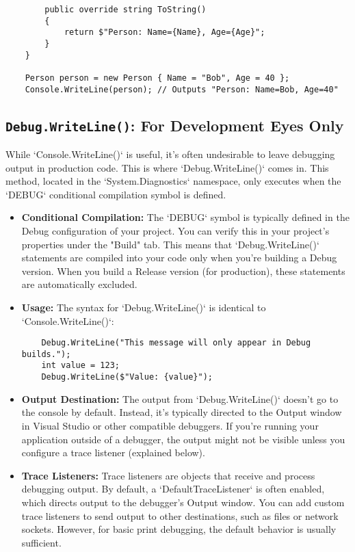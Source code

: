\documentclass{article}
\begin{document}
{{{{\begin{itemize}
\begin{verbatim}
        public override string ToString()
        {
            return $"Person: Name={Name}, Age={Age}";
        }
    }

    Person person = new Person { Name = "Bob", Age = 40 };
    Console.WriteLine(person); // Outputs "Person: Name=Bob, Age=40"
    \end{verbatim}
\end{itemize}

\subsection*{\texttt{Debug.WriteLine()}: For Development Eyes Only}

While `Console.WriteLine()` is useful, it's often undesirable to leave debugging output in production code. This is where `Debug.WriteLine()` comes in. This method, located in the `System.Diagnostics` namespace, only executes when the `DEBUG` conditional compilation symbol is defined.

\begin{itemize}
    \item \textbf{Conditional Compilation:} The `DEBUG` symbol is typically defined in the Debug configuration of your project. You can verify this in your project's properties under the "Build" tab. This means that `Debug.WriteLine()` statements are compiled into your code only when you're building a Debug version. When you build a Release version (for production), these statements are automatically excluded.

    \item \textbf{Usage:} The syntax for `Debug.WriteLine()` is identical to `Console.WriteLine()`:

    \begin{verbatim}
    Debug.WriteLine("This message will only appear in Debug builds.");
    int value = 123;
    Debug.WriteLine($"Value: {value}");
    \end{verbatim}

    \item \textbf{Output Destination:} The output from `Debug.WriteLine()` doesn't go to the console by default. Instead, it's typically directed to the Output window in Visual Studio or other compatible debuggers. If you're running your application outside of a debugger, the output might not be visible unless you configure a trace listener (explained below).

    \item \textbf{Trace Listeners:} Trace listeners are objects that receive and process debugging output. By default, a `DefaultTraceListener` is often enabled, which directs output to the debugger's Output window. You can add custom trace listeners to send output to other destinations, such as files or network sockets. However, for basic print debugging, the default behavior is usually sufficient.
\end{itemize}

}}}}
\end{document}
